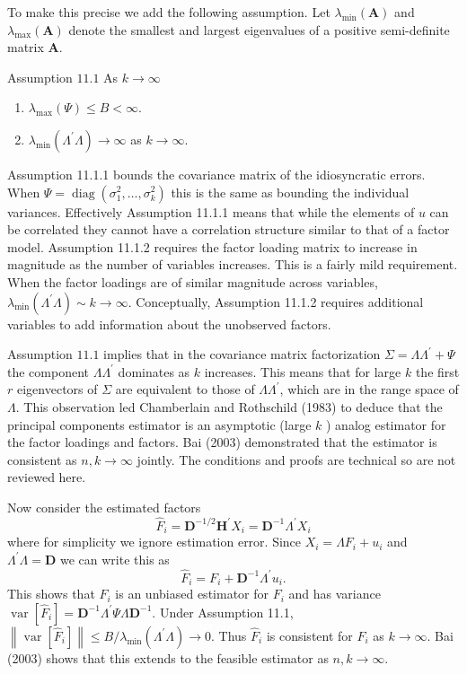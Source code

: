 \documentclass[10pt]{article}
\begin{document}
To make this precise we add the following assumption. Let $\lambda_{\min }(\boldsymbol{A})$ and $\lambda_{\max }(\boldsymbol{A})$ denote the smallest and largest eigenvalues of a positive semi-definite matrix $\boldsymbol{A}$.

Assumption $11.1$ As $k \rightarrow \infty$

\begin{enumerate}
  \item $\lambda_{\max }(\Psi) \leq B<\infty$.

  \item $\lambda_{\min }\left(\Lambda^{\prime} \Lambda\right) \rightarrow \infty$ as $k \rightarrow \infty$.

\end{enumerate}
Assumption 11.1.1 bounds the covariance matrix of the idiosyncratic errors. When $\Psi=\operatorname{diag}\left(\sigma_{1}^{2}, \ldots, \sigma_{k}^{2}\right)$ this is the same as bounding the individual variances. Effectively Assumption 11.1.1 means that while the elements of $u$ can be correlated they cannot have a correlation structure similar to that of a factor model. Assumption 11.1.2 requires the factor loading matrix to increase in magnitude as the number of variables increases. This is a fairly mild requirement. When the factor loadings are of similar magnitude across variables, $\lambda_{\min }\left(\Lambda^{\prime} \Lambda\right) \sim k \rightarrow \infty$. Conceptually, Assumption 11.1.2 requires additional variables to add information about the unobserved factors.

Assumption $11.1$ implies that in the covariance matrix factorization $\Sigma=\Lambda \Lambda^{\prime}+\Psi$ the component $\Lambda \Lambda^{\prime}$ dominates as $k$ increases. This means that for large $k$ the first $r$ eigenvectors of $\Sigma$ are equivalent to those of $\Lambda \Lambda^{\prime}$, which are in the range space of $\Lambda$. This observation led Chamberlain and Rothschild (1983) to deduce that the principal components estimator is an asymptotic (large $k$ ) analog estimator for the factor loadings and factors. Bai (2003) demonstrated that the estimator is consistent as $n, k \rightarrow \infty$ jointly. The conditions and proofs are technical so are not reviewed here.

Now consider the estimated factors
$$
\widehat{F}_{i}=\boldsymbol{D}^{-1 / 2} \boldsymbol{H}^{\prime} X_{i}=\boldsymbol{D}^{-1} \Lambda^{\prime} X_{i}
$$
where for simplicity we ignore estimation error. Since $X_{i}=\Lambda F_{i}+u_{i}$ and $\Lambda^{\prime} \Lambda=\boldsymbol{D}$ we can write this as
$$
\widehat{F}_{i}=F_{i}+\boldsymbol{D}^{-1} \Lambda^{\prime} u_{i} .
$$
This shows that $\widehat{F}_{i}$ is an unbiased estimator for $F_{i}$ and has variance $\operatorname{var}\left[\widehat{F}_{i}\right]=\boldsymbol{D}^{-1} \Lambda^{\prime} \Psi \Lambda \boldsymbol{D}^{-1}$. Under Assumption 11.1, $\left\|\operatorname{var}\left[\widehat{F}_{i}\right]\right\| \leq B / \lambda_{\min }\left(\Lambda^{\prime} \Lambda\right) \rightarrow 0$. Thus $\widehat{F}_{i}$ is consistent for $F_{i}$ as $k \rightarrow \infty$. Bai (2003) shows that this extends to the feasible estimator as $n, k \rightarrow \infty$.
\end{document}
